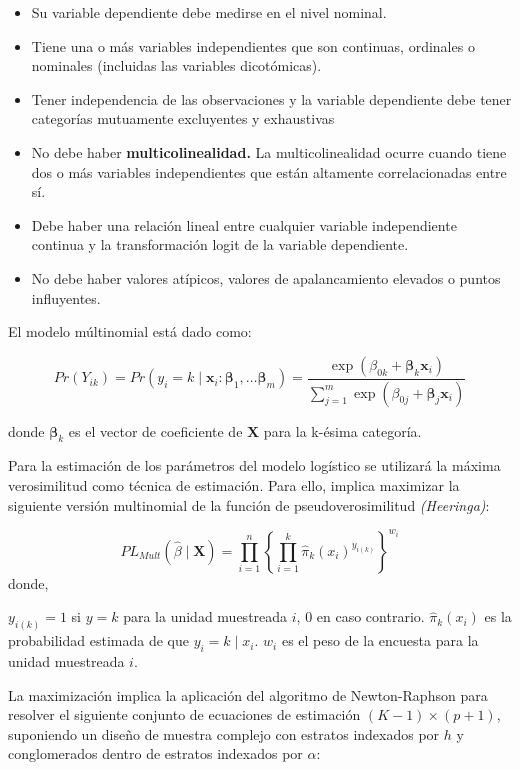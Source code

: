 \documentclass[
  spanish,
  12pt,
]{book}
\begin{document}
\begin{itemize}
\item
  Su variable dependiente debe medirse en el nivel nominal.
\item
  Tiene una o más variables independientes que son continuas, ordinales o nominales (incluidas las variables dicotómicas).
\item
  Tener independencia de las observaciones y la variable dependiente debe tener categorías mutuamente excluyentes y exhaustivas
\item
  No debe haber \textbf{multicolinealidad.} La multicolinealidad ocurre cuando tiene dos o más variables independientes que están altamente correlacionadas entre sí.
\item
  Debe haber una relación lineal entre cualquier variable independiente continua y la transformación logit de la variable dependiente.
\item
  No debe haber valores atípicos, valores de apalancamiento elevados o puntos influyentes.
\end{itemize}

El modelo múltinomial está dado como:

\[
Pr\left(Y_{ik}\right)=Pr\left(y_{i}=k\mid\boldsymbol{x}_{i}:\boldsymbol{\beta}_{1},\dots\boldsymbol{\beta}_{m}\right)=\frac{\exp\left(\beta_{0k}+\boldsymbol{\beta}_{k}\boldsymbol{x}_{i}\right)}{\sum_{j=1}^{m}\exp\left(\beta_{0j}+\boldsymbol{\beta}_{j}\boldsymbol{x}_{i}\right)}
\]

donde \(\boldsymbol{\beta}_k\) es el vector de coeficiente de \(\boldsymbol{X}\) para la k-ésima categoría.

Para la estimación de los parámetros del modelo logístico se utilizará la máxima verosimilitud como técnica de estimación. Para ello, implica maximizar la siguiente versión multinomial de la función de pseudoverosimilitud \emph{(Heeringa)}:

\[
PL_{Mult}\left(\hat{\beta}\mid\boldsymbol{X}\right)  =  \prod_{i=1}^{n}\left\{ \prod_{i=1}^{k}\hat{\pi}_{k}\left(x_{i}\right)^{y_{i\left(k\right)}}\right\} ^{w_{i}}
\]
donde,

\(y_{i\left(k\right)}=1\) si \(y = k\) para la unidad muestreada \(i\), 0 en caso contrario. \(\hat{\pi}_{k}\left(x_{i}\right)\) es la probabilidad estimada de que \(y_{i}=k\mid x_{i}\). \(w_{i}\) es el peso de la encuesta para la unidad muestreada \(i\).

La maximización implica la aplicación del algoritmo de Newton-Raphson para resolver el siguiente conjunto de ecuaciones de estimación \(\left(K-1\right)\times\left(p+1\right)\),
suponiendo un diseño de muestra complejo con estratos indexados por \(h\) y conglomerados dentro de estratos indexados por \(\alpha\):
\end{document}
